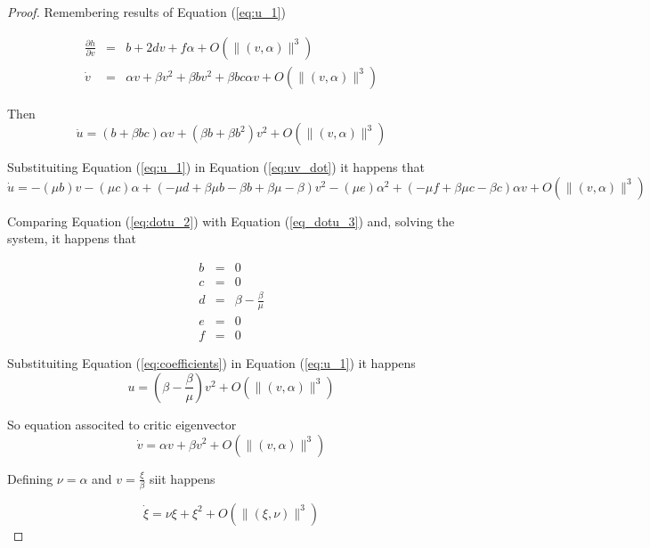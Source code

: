 \begin{proof}
Remembering results of Equation (\ref{eq:u_1})

\begin{equation}
    \begin{array}{ccc}
        \frac{\partial h}{\partial v} &=& b + 2dv+f\alpha+O\left(\|(v,\alpha)\|^3\right) \\
        \dot{v} &=& \alpha v + \beta v^2 + \beta b v^2 + \beta bc \alpha v + O\left(\|(v,\alpha)\|^3\right)
    \end{array}
\end{equation}

Then 
\begin{equation}
    \label{eq:dotu_2}
    \dot{u} = (b+\beta bc)\alpha v + (\beta b + \beta b^2) v^2 + O\left(\|(v,\alpha)\|^3\right)
\end{equation}

Substituiting Equation (\ref{eq:u_1}) in Equation (\ref{eq:uv_dot}) it happens that
\begin{equation}
    \label{eq_dotu_3}
    \dot{u} = -(\mu b)v -(\mu c)\alpha +(-\mu d + \beta\mu b -\beta b+\beta\mu-\beta)v^2-(\mu e)\alpha^2+(-\mu f+\beta\mu c -\beta c)\alpha v+O\left(\|(v,\alpha)\|^3\right)
\end{equation}

Comparing Equation (\ref{eq:dotu_2}) with Equation (\ref{eq_dotu_3}) and, solving the system, it happens that

\begin{equation}
    \label{eq:coefficients}
    \begin{array}{ccc}
        b &=& 0 \\
        c &=& 0 \\
        d &=& \beta-\frac{\beta}{\mu} \\
        e &=& 0 \\
        f &=& 0
    \end{array}
\end{equation}

Substituiting Equation (\ref{eq:coefficients}) in Equation (\ref{eq:u_1}) it happens
\begin{equation}
    u = \left(\beta - \frac{\beta}{\mu}\right) v^2 + O\left(\|(v,\alpha)\|^3\right)
\end{equation}

So equation associted to critic eigenvector
\begin{equation}
    \dot{v} = \alpha v + \beta v^2 + O\left(\|(v,\alpha)\|^3\right)
\end{equation}

Defining $\nu = \alpha$ and $v = \frac{\xi}{\beta}$ siit happens

\begin{equation}
    \dot{\xi} = \nu\xi + \xi^2 + O\left(\|(\xi,\nu)\|^3\right)
\end{equation}
\end{proof}